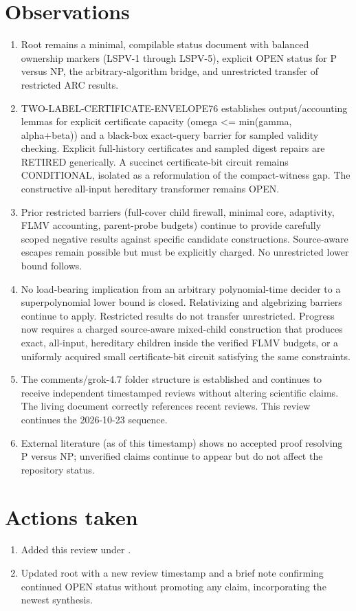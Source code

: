 \documentclass[11pt]{article}
\begin{document}
\section{Observations}
\begin{enumerate}
\item Root  remains a minimal, compilable status document with balanced ownership markers (LSPV-1 through LSPV-5), explicit OPEN status for P versus NP, the arbitrary-algorithm bridge, and unrestricted transfer of restricted ARC results.
\item TWO-LABEL-CERTIFICATE-ENVELOPE76 establishes output/accounting lemmas for explicit certificate capacity (omega <= min(gamma, alpha+beta)) and a black-box exact-query barrier for sampled validity checking. Explicit full-history certificates and sampled digest repairs are RETIRED generically. A succinct certificate-bit circuit remains CONDITIONAL, isolated as a reformulation of the compact-witness gap. The constructive all-input hereditary transformer remains OPEN.
\item Prior restricted barriers (full-cover child firewall, minimal core, adaptivity, FLMV accounting, parent-probe budgets) continue to provide carefully scoped negative results against specific candidate constructions. Source-aware escapes remain possible but must be explicitly charged. No unrestricted lower bound follows.
\item No load-bearing implication from an arbitrary polynomial-time decider to a superpolynomial lower bound is closed. Relativizing and algebrizing barriers continue to apply. Restricted results do not transfer unrestricted. Progress now requires a charged source-aware mixed-child construction that produces exact, all-input, hereditary children inside the verified FLMV budgets, or a uniformly acquired small certificate-bit circuit satisfying the same constraints.
\item The comments/grok-4.7 folder structure is established and continues to receive independent timestamped reviews without altering scientific claims. The living document correctly references recent reviews. This review continues the 2026-10-23 sequence.
\item External literature (as of this timestamp) shows no accepted proof resolving P versus NP; unverified claims continue to appear but do not affect the repository status.
\end{enumerate}

\section{Actions taken}
\begin{enumerate}
\item Added this review under .
\item Updated root  with a new review timestamp and a brief note confirming continued OPEN status without promoting any claim, incorporating the newest synthesis.
\end{enumerate}
\end{document}
